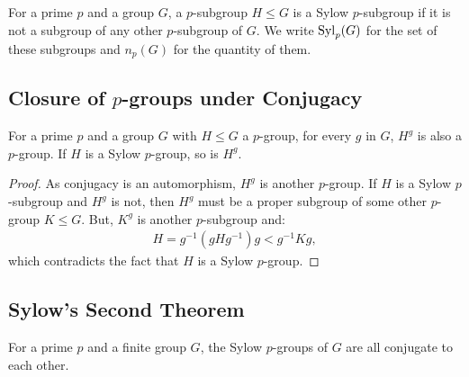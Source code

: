 For a prime $p$ and a group $G$, a $p$-subgroup $H \leq G$
is a Sylow $p$-subgroup if it is not a subgroup of any other
$p$-subgroup of $G$. We write $\operatorname{Syl}_p(G)$ for the set of
these subgroups and $n_p(G)$ for the quantity of them.

\subsection{Closure of $p$-groups under Conjugacy}  \label{6.5}

For a prime $p$ and a group $G$ with $H \leq G$ a $p$-group,
for every $g$ in $G$, $H^g$ is also a $p$-group.
If $H$ is a Sylow $p$-group, so is $H^g$. 

\begin{proof}
    As conjugacy is an automorphism, $H^g$ is another $p$-group.
    If $H$ is a Sylow $p$-subgroup and $H^g$ is not, then $H^g$ 
    must be a proper subgroup of some other $p$-group $K \leq G$.
    But, $K^g$ is another $p$-subgroup and: \begin{align*}
        H = g^{-1}(gHg^{-1})g < g^{-1}Kg,
    \end{align*} which contradicts the fact that $H$ is a
    Sylow $p$-group.
\end{proof}

\subsection{Sylow's Second Theorem}  \label{6.6}

For a prime $p$ and a finite group $G$, the Sylow $p$-groups
of $G$ are all conjugate to each other.

